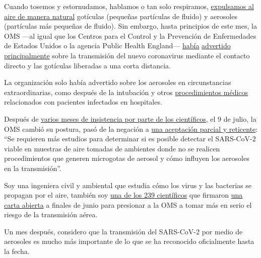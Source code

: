 Cuando tosemos y estornudamos, hablamos o tan solo respiramos,
\href{https://www.sciencedirect.com/science/article/pii/S0021850211001200}{expulsamos
al aire de manera natural} gotículas (pequeñas partículas de fluido) y
aerosoles (partículas más pequeñas de fluido). Sin embargo, hasta
principios de este mes, la OMS ---al igual que los Centros para el
Control y la Prevención de Enfermedades de Estados Unidos o la agencia
Public Health England---
\href{https://www.who.int/news-room/commentaries/detail/modes-of-transmission-of-virus-causing-covid-19-implications-for-ipc-precaution-recommendations}{había}
\href{https://www.who.int/news-room/commentaries/detail/modes-of-transmission-of-virus-causing-covid-19-implications-for-ipc-precaution-recommendations}{advertido
principalmente} sobre la transmisión del nuevo coronavirus mediante el
contacto directo y las gotículas liberadas a una corta distancia.

La organización solo había advertido sobre los aerosoles en
circunstancias extraordinarias, como después de la intubación y otros
\href{https://www.who.int/publications/i/item/WHO-2019-nCoV-IPC-2020.4}{procedimientos
médicos} relacionados con pacientes infectados en hospitales.

Después de
\href{https://www.nature.com/articles/d41586-020-00974-w\#ref-CR5}{varios
meses de insistencia por parte de los científicos}, el 9 de julio, la
OMS cambió su postura, pasó de la negación a
\href{https://www.who.int/news-room/commentaries/detail/transmission-of-sars-cov-2-implications-for-infection-prevention-precautions}{una
aceptación parcial y reticente}: ``Se requieren más estudios para
determinar si es posible detectar el SARS-CoV-2 viable en muestras de
aire tomadas de ambientes donde no se realicen procedimientos que
generen microgotas de aerosol y cómo influyen los aerosoles en la
transmisión''.

Soy una ingeniera civil y ambiental que estudia cómo los virus y las
bacterias se propagan por el aire, también soy
\href{https://www.nytimes3xbfgragh.onion/es/2020/07/06/espanol/ciencia-y-tecnologia/coronavirus-transmision-aire.html}{una
de los 239 científicos} que firmaron
\href{https://academic.oup.com/cid/article/doi/10.1093/cid/ciaa939/5867798}{una
carta abierta} a finales de junio para presionar a la OMS a tomar más en
serio el riesgo de la transmisión aérea.

Un mes después, considero que la transmisión del SARS-CoV-2 por medio de
aerosoles es mucho más importante de lo que se ha reconocido
oficialmente hasta la fecha.

